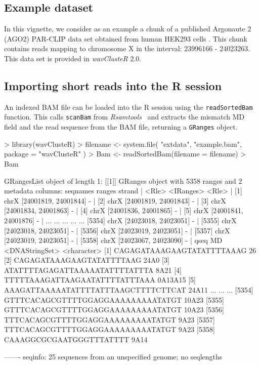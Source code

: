 \documentclass{article}
\newcommand{\Robject}[1]{\texttt{#1}}
\newcommand{\Rpackage}[1]{\textit{#1}}
\newcommand{\Rfunction}[1]{{\texttt{#1}}}
\begin{document}
\subsection{Example dataset} 
In this vignette, we consider as an example a chunk of a published Argonaute 2 (AGO2) PAR-CLIP data set obtained from human HEK293 cells \cite{Kishore:2011p4559}. This chunk contains reads mapping to chromosome X in the interval: 23996166 - 24023263. This data set is provided in \Rpackage{wavClusteR} 2.0.
%
\subsection{Importing short reads into the R session} 
%
An indexed BAM file can be loaded into the R session using the \Rfunction{readSortedBam} function. This calls \Rfunction{scanBam} from \Rpackage{Rsamtools}~\cite{rsamtools} and extracts the mismatch MD field and the read sequence from the BAM file, returning a \Robject{GRanges} object.
%
\begin{Schunk}
\begin{Sinput}
> library(wavClusteR)
> filename <- system.file( "extdata", "example.bam", package = "wavClusteR" )
> Bam <- readSortedBam(filename = filename)
> Bam
\end{Sinput}
\begin{Soutput}
GRangesList object of length 1:
[[1]] 
GRanges object with 5358 ranges and 2 metadata columns:
         seqnames               ranges strand   |
            <Rle>            <IRanges>  <Rle>   |
     [1]     chrX [24001819, 24001844]      -   |
     [2]     chrX [24001819, 24001843]      -   |
     [3]     chrX [24001834, 24001863]      -   |
     [4]     chrX [24001836, 24001865]      -   |
     [5]     chrX [24001841, 24001876]      -   |
     ...      ...                  ...    ... ...
  [5354]     chrX [24023018, 24023051]      -   |
  [5355]     chrX [24023018, 24023051]      -   |
  [5356]     chrX [24023019, 24023051]      -   |
  [5357]     chrX [24023019, 24023051]      -   |
  [5358]     chrX [24023067, 24023090]      -   |
                                         qseq          MD
                               <DNAStringSet> <character>
     [1]           CAGAGATAAAGAAGTATATTTTAAAG          26
     [2]            CAGAGATAAAGAAGTATATTTTAAG        24A0
     [3]       ATATTTTAGAGATTAAAAATATTTTATTTA        8A21
     [4]       TTTTTAAAGATTAAGAATATTTTATTTAAA     0A13A15
     [5] AAAGATTAAAAATATTTTATTTAAGCTTTTCTTCAT       24A11
     ...                                  ...         ...
  [5354]   GTTTCACAGCGTTTTGGAGGAAAAAAAAATATGT       10A23
  [5355]   GTTTCACAGCGTTTTGGAGGAAAAAAAAATATGT       10A23
  [5356]    TTTCACAGCGTTTTGGAGGAAAAAAAAATATGT        9A23
  [5357]    TTTCACAGCGTTTTGGAGGAAAAAAAAATATGT        9A23
  [5358]             CAAAGGCGCGAATGGGTTTATTTT        9A14

-------
seqinfo: 25 sequences from an unspecified genome; no seqlengths
\end{Soutput}
\end{Schunk}
%
\end{document}
